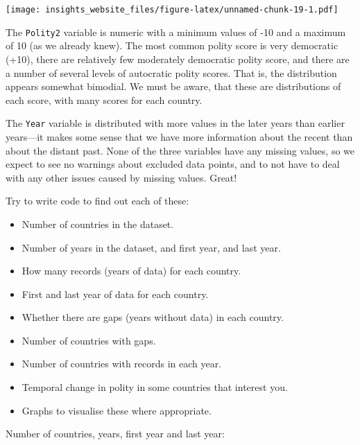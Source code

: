 \documentclass[]{book}
\newenvironment{Shaded}{\begin{snugshade}}{\end{snugshade}}
\newcommand{\DataTypeTok}[1]{\textcolor[rgb]{0.13,0.29,0.53}{#1}}
\newcommand{\KeywordTok}[1]{\textcolor[rgb]{0.13,0.29,0.53}{\textbf{#1}}}
\newcommand{\NormalTok}[1]{#1}
\newcommand{\OperatorTok}[1]{\textcolor[rgb]{0.81,0.36,0.00}{\textbf{#1}}}
\newcommand{\StringTok}[1]{\textcolor[rgb]{0.31,0.60,0.02}{#1}}
\providecommand{\tightlist}{%
  \setlength{\itemsep}{0pt}\setlength{\parskip}{0pt}}
\begin{document}
\texttt{[image: insights\_website\_files/figure-latex/unnamed-chunk-19-1.pdf]}

The \texttt{Polity2} variable is numeric with a minimum values of -10 and a maximum of 10 (as we already knew). The most common polity score is very democratic (+10), there are relatively few moderately democratic polity score, and there are a number of several levels of autocratic polity scores. That is, the distribution appears somewhat bimodial. We must be aware, that these are distributions of each score, with many scores for each country.

The \texttt{Year} variable is distributed with more values in the later years than earlier years---it makes some sense that we have more information about the recent than about the distant past. None of the three variables have any missing values, so we expect to see no warnings about excluded data points, and to not have to deal with any other issues caused by missing values. Great!

Try to write code to find out each of these:

\begin{itemize}
\tightlist
\item
  Number of countries in the dataset.
\item
  Number of years in the dataset, and first year, and last year.
\item
  How many records (years of data) for each country.
\item
  First and last year of data for each country.
\item
  Whether there are gaps (years without data) in each country.
\item
  Number of countries with gaps.
\item
  Number of countries with records in each year.
\item
  Temporal change in polity in some countries that interest you.
\item
  Graphs to visualise these where appropriate.
\end{itemize}

Number of countries, years, first year and last year:

\begin{Shaded}
\end{Shaded}
\end{document}
